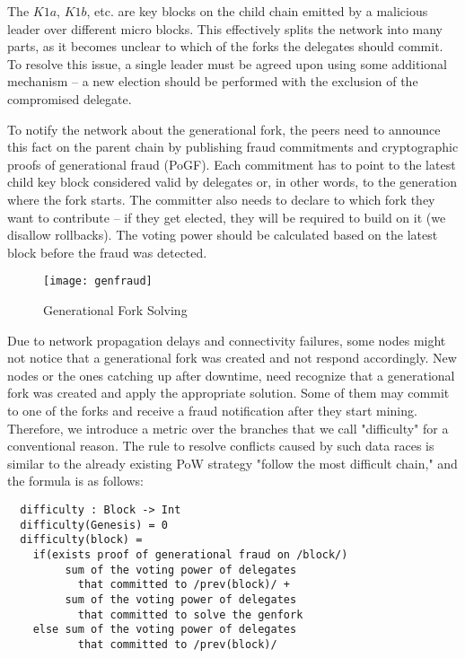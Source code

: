 The $K1a$, $K1b$, etc. are key blocks on the child chain emitted by a malicious
leader over different micro blocks. This
effectively splits the network into many parts, as it becomes unclear to which of
the forks the delegates should commit. To resolve this issue, a single leader
must be agreed upon using some additional mechanism – a new election
should be performed with the exclusion of the compromised delegate.

To notify the network about the generational fork, the peers need to announce
this fact on the parent chain by publishing fraud commitments and
cryptographic proofs of generational fraud (PoGF). Each commitment has to point to
the latest child key block considered valid by delegates or,
 in other words, to the generation where the fork starts. The committer also needs
to declare to which fork they want to contribute – if they get elected, they
will be required to build on it (we disallow rollbacks). The voting power should be
calculated based on the latest block before the fraud was detected.


\begin{figure}[h]
	\caption{Generational Fork Solving}
	\centering
	\texttt{[image: genfraud]}
\end{figure}

Due to network propagation
delays and connectivity failures, some nodes might not notice that a generational
fork was created and not respond accordingly. New nodes or the ones catching up
after downtime, need recognize that a generational fork was created and apply
the appropriate solution. Some of them may commit to one of the forks and receive a fraud
notification after they start mining. Therefore, we introduce a metric over the
branches that we call "difficulty" for a conventional reason. The
rule to resolve conflicts caused by such data races is similar to the already
existing PoW strategy "follow the most difficult chain," and the formula is
as follows:

\begin{minipage}{\linewidth}
\begin{lstlisting}
  difficulty : Block -> Int
  difficulty(Genesis) = 0
  difficulty(block) =
    if(exists proof of generational fraud on /block/)
         sum of the voting power of delegates
           that committed to /prev(block)/ +
         sum of the voting power of delegates
           that committed to solve the genfork
    else sum of the voting power of delegates
           that committed to /prev(block)/
\end{lstlisting}
\end{minipage}

